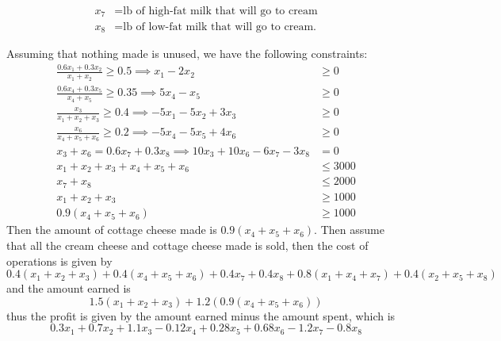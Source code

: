 \documentclass{article}
\begin{document}
\begin{enumerate}
\begin{align*}
			x_7 &= \text{lb of high-fat milk that will go to cream} \\
			x_8 &= \text{lb of low-fat milk that will go to cream.} 
		\end{align*}
		\begin{soln}
			Assuming that nothing made is unused, we have the following constraints:
			\begin{align*}
				\frac{0.6x_1+0.3x_2}{x_1+x_2} \ge 0.5 \implies x_1-2x_2 &\ge 0 \\
				\frac{0.6x_4+0.3x_5}{x_4+x_5} \ge 0.35 \implies 5x_4-x_5 &\ge 0 \\
				\frac{x_3}{x_1+x_2+x_3} \ge 0.4 \implies -5x_1-5x_2+3x_3 &\ge 0 \\
				\frac{x_6}{x_4+x_5+x_6} \ge 0.2 \implies -5x_4-5x_5+4x_6 &\ge 0 \\
				x_3+x_6=0.6x_7+0.3x_8 \implies 10x_3+10x_6-6x_7-3x_8 &= 0 \\
				x_1+x_2+x_3+x_4+x_5+x_6 &\le 3000 \\
				x_7+x_8 &\le 2000 \\
				x_1+x_2+x_3 &\ge 1000 \\
				0.9(x_4+x_5+x_6) &\ge 1000
			\end{align*} 
			Then the amount of cottage cheese made is $0.9(x_4+x_5+x_6).$ Then assume that all the cream cheese and cottage cheese made is sold, then the cost of operations is given by \[0.4(x_1+x_2+x_3) + 0.4(x_4+x_5+x_6) + 0.4x_7+0.4x_8+0.8(x_1+x_4+x_7) + 0.4(x_2+x_5+x_8)\] and the amount earned is \[1.5(x_1+x_2+x_3)+1.2(0.9(x_4+x_5+x_6))\] thus the profit is given by the amount earned minus the amount spent, which is \[0.3x_1+0.7x_2+1.1x_3 -0.12x_4+0.28x_5+0.68x_6-1.2x_7-0.8x_8\]


\end{soln}
\end{enumerate}
\end{document}
